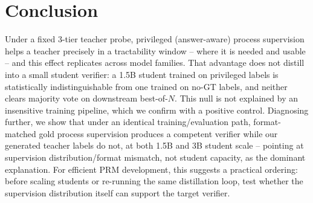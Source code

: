 \documentclass[11pt]{article}
\begin{document}
\section{Conclusion}
\label{sec:conclusion}

Under a fixed 3-tier teacher probe, privileged (answer-aware) process
supervision helps a teacher precisely in a tractability window -- where it
is needed and usable -- and this effect replicates across model families.
That advantage does not distill into a small student verifier: a 1.5B
student trained on privileged labels is statistically indistinguishable from
one trained on no-GT labels, and neither clears majority vote on downstream
best-of-$N$. This null is not explained by an insensitive training pipeline,
which we confirm with a positive control. Diagnosing further, we show that
under an identical training/evaluation path, format-matched gold process
supervision produces a competent verifier while our generated teacher labels
do not, at both 1.5B and 3B student scale -- pointing at supervision
distribution/format mismatch, not student capacity, as the dominant
explanation. For efficient PRM development, this suggests a practical
ordering: before scaling students or re-running the same distillation loop,
test whether the supervision distribution itself can support the target
verifier.
\end{document}
